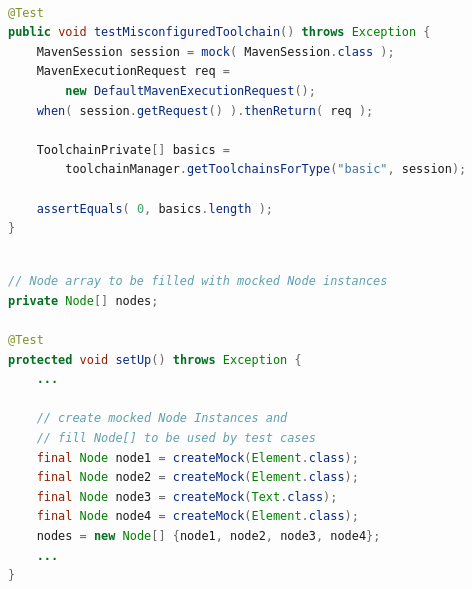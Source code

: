 
\begin{lstlisting}[basicstyle=\ttfamily, caption={This code snippet illustrates an example from maven-core, where both the focal method and a method invocation on a mock object occur in test \textit{testMisconfiguredToolchain()}},
basicstyle=\scriptsize\ttfamily,language = Java, framesep=4.5mm,
framexleftmargin=1.0mm, captionpos=b, xleftmargin=3.5ex, label=lis:mockCall]

@Test
public void testMisconfiguredToolchain() throws Exception {
	MavenSession session = mock( MavenSession.class );
	MavenExecutionRequest req = 
		new DefaultMavenExecutionRequest();
	when( session.getRequest() ).thenReturn( req );
	
	ToolchainPrivate[] basics =
	 	toolchainManager.getToolchainsForType("basic", session);
	
	assertEquals( 0, basics.length );
}

\end{lstlisting}

\begin{lstlisting}[basicstyle=\ttfamily, caption={This example illustrates a field array container holding mock objects from \textit{setup()} in \texttt{NodeListIteratorTest.java}.},
basicstyle=\scriptsize\ttfamily,language = Java, framesep=4.5mm, framexleftmargin=1.0mm, captionpos=b, xleftmargin=3.5ex, label=lis:container]

// Node array to be filled with mocked Node instances
private Node[] nodes;

@Test
protected void setUp() throws Exception {
	...
	
	// create mocked Node Instances and 
	// fill Node[] to be used by test cases
	final Node node1 = createMock(Element.class);
	final Node node2 = createMock(Element.class);
	final Node node3 = createMock(Text.class);
	final Node node4 = createMock(Element.class);
	nodes = new Node[] {node1, node2, node3, node4};
	...
}

\end{lstlisting}


